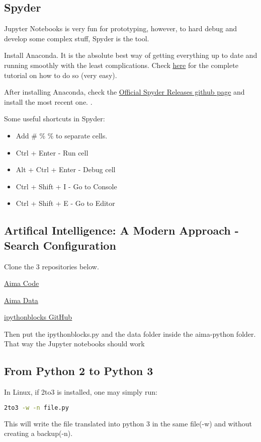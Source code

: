\subsection{Spyder}
Jupyter Notebooks is very fun for prototyping, however, to hard debug and develop some complex stuff, Spyder is the tool.

Install Anaconda. It is the absolute best way of getting everything up to date and running smoothly with the least complications. Check \href{https://linuxize.com/post/how-to-install-anaconda-on-ubuntu-18-04/}{\ul{here}} for the complete tutorial on how to do so (very easy).

After installing Anaconda, check the \href{https://github.com/spyder-ide/spyder/releases}{\ul{Official Spyder Releases github page}} and install the most recent one. .




Some useful shortcuts in Spyder:
\begin{itemize}
    \item Add \# \% \% to separate cells.
    \item Ctrl + Enter - Run cell
    \item Alt + Ctrl + Enter - Debug cell
    \item Ctrl + Shift + I - Go to Console
    \item Ctrl + Shift + E - Go to Editor
\end{itemize}



\subsection{Artifical Intelligence: A Modern Approach - Search Configuration}

Clone the 3 repositories below.

\href{https://github.com/aimacode/aima-python}{\ul{Aima Code}}

\href{https://github.com/aimacode/aima-data/tree/f6cbea61ad0c21c6b7be826d17af5a8d3a7c2c86}{\ul{Aima Data}}

\href{https://github.com/jiffyclub/ipythonblocks/blob/master/ipythonblocks/ipythonblocks.py}{\ul{ipythonblocks GitHub}}

Then put the ipythonblocks.py and the data folder inside the aima-python folder. That way the Jupyter notebooks should work

\subsection{From Python 2 to Python 3}
In Linux, if 2to3 is installed, one may simply run:
\begin{lstlisting}[language=bash]
    2to3 -w -n file.py    
\end{lstlisting}
This will write the file translated into python 3 in the same file(-w) and without creating a backup(-n).


